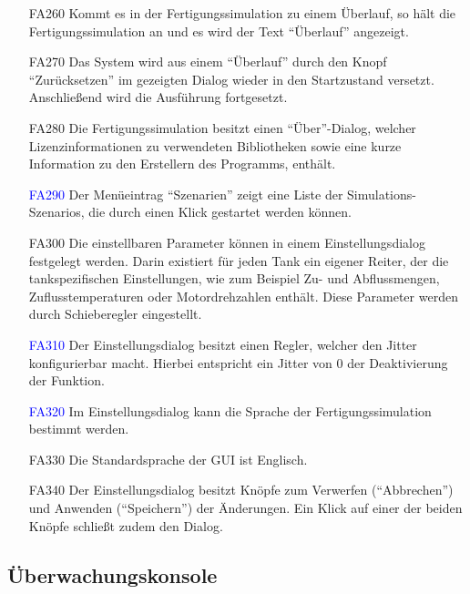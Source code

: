 \documentclass[parskip=full]{scrartcl}
\begin{document}
\begin{enumerate}
  \item[FA260] Kommt es in der \gls{Fertigungssimulation} zu einem \"Uberlauf, so h\"alt die \gls{Fertigungssimulation} an und es wird der Text "`\"Uberlauf"' angezeigt.
  \item[FA270] Das System wird aus einem "`\"Uberlauf"' durch den Knopf "`Zur\"ucksetzen"' im gezeigten Dialog wieder in den Startzustand versetzt. Anschlie{\ss}end wird die Ausführung fortgesetzt.	
  \item[FA280] Die \gls{Fertigungssimulation} besitzt einen "`Über"'-Dialog, welcher Lizenzinformationen zu verwendeten Bibliotheken
    sowie eine kurze Information zu den Erstellern des Programms, enthält.
  \item[\textcolor{blue}{FA290}] Der Menüeintrag "`Szenarien"' zeigt eine Liste der \glspl{Simulations-Szenario}, die durch einen Klick gestartet werden können.
  \item[FA300] Die einstellbaren Parameter können in einem Einstellungsdialog festgelegt werden. Darin existiert für jeden Tank ein eigener Reiter, der die 
    tankspezifischen Einstellungen, wie zum Beispiel Zu- und Abflussmengen, Zuflusstemperaturen oder Motordrehzahlen enthält.
    Diese Parameter werden durch Schieberegler eingestellt.
  \item[\textcolor{blue}{FA310}] Der Einstellungsdialog besitzt einen Regler, welcher den \gls{Jitter} konfigurierbar macht.
    Hierbei entspricht ein \gls{Jitter} von 0 der Deaktivierung der Funktion.
  \item[\textcolor{blue}{FA320}] Im Einstellungsdialog kann die Sprache der \gls{Fertigungssimulation} bestimmt werden.
  \item[FA330] Die Standardsprache der \gls{GUI} ist Englisch.
  \item[FA340] Der Einstellungsdialog besitzt Knöpfe zum Verwerfen ("`Abbrechen"') und Anwenden ("`Speichern"') der Änderungen. Ein Klick auf einer der beiden Knöpfe schließt zudem den Dialog.    
\end{enumerate}

\subsection{Überwachungskonsole}
\end{document}
